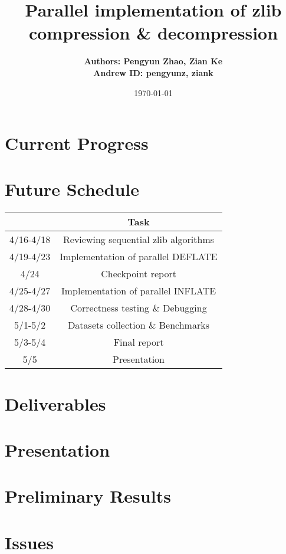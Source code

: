 \documentclass{article}
\title{Parallel implementation of zlib compression \& decompression}
\author{\textbf{Authors: Pengyun Zhao, Zian Ke}\\\textbf{Andrew ID: pengyunz, ziank}}
\date{\today}
\begin{document}
\maketitle

\section{Current Progress}


\section{Future Schedule}
\begin{table}[!hbp]
\begin{center}
\begin{tabular}{|c|c|}
\hline
 & Task \\ \hline
4/16-4/18 & Reviewing sequential zlib algorithms \\ \hline
4/19-4/23 & Implementation of parallel DEFLATE \\ \hline
4/24 & Checkpoint report \\ \hline
4/25-4/27 & Implementation of parallel INFLATE \\ \hline
4/28-4/30 & Correctness testing \& Debugging \\ \hline
5/1-5/2 & Datasets collection \& Benchmarks \\ \hline
5/3-5/4 & Final report \\ \hline
5/5 & Presentation \\ \hline
\end{tabular}
\end{center}
\end{table}

\section{Deliverables}

\section{Presentation}

\section{Preliminary Results}

\section{Issues}
\end{document}
